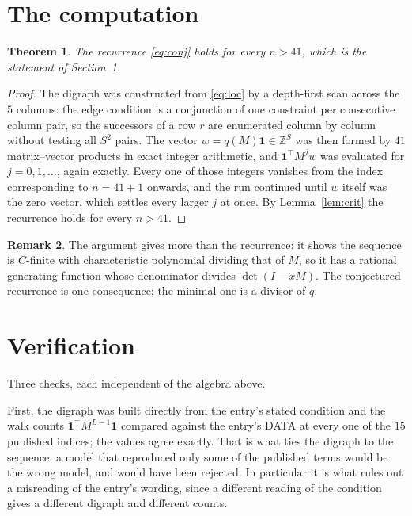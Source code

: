 \documentclass[11pt,a4paper]{article}
\theoremstyle{plain}
\newtheorem{theorem}{Theorem}
\theoremstyle{definition}
\newtheorem{remark}[theorem]{Remark}
\begin{document}
\section{The computation}

\begin{theorem}
The recurrence \eqref{eq:conj} holds for every $n>41$, which is the statement of
Section~1.
\end{theorem}

\begin{proof}
The digraph was constructed from \eqref{eq:loc} by a depth-first scan across the $5$
columns: the edge condition is a conjunction of one constraint per consecutive column
pair, so the successors of a row $r$ are enumerated column by column without testing all
$S^2$ pairs. The vector $w=q(M)\mathbf{1}\in\mathbb{Z}^{S}$ was then formed by $41$
matrix--vector products in exact integer arithmetic, and $\mathbf{1}^{\!\top}M^{j}w$ was
evaluated for $j=0,1,\dots$, again exactly. Every one of those integers vanishes from the
index corresponding to $n=41+1$ onwards, and the run continued until $w$ itself was the
zero vector, which settles every larger $j$ at once. By Lemma~\ref{lem:crit} the recurrence
holds for every $n>41$.
\end{proof}

\begin{remark}
The argument gives more than the recurrence: it shows the sequence is $C$-finite with
characteristic polynomial dividing that of $M$, so it has a rational generating function
whose denominator divides $\det(I-xM)$. The conjectured recurrence is one consequence; the
minimal one is a divisor of $q$.
\end{remark}

\section{Verification}

Three checks, each independent of the algebra above.

First, the digraph was built directly from the entry's stated condition and the walk counts
$\mathbf{1}^{\!\top}M^{L-1}\mathbf{1}$ compared against the entry's DATA at
every one of the $15$ published indices; the values agree exactly. That is what ties
the digraph to the sequence: a model that reproduced only some of the published terms would
be the wrong model, and would have been rejected. In particular it is what rules out a
misreading of the entry's wording, since a different reading of the condition gives a
different digraph and different counts.
\end{document}
